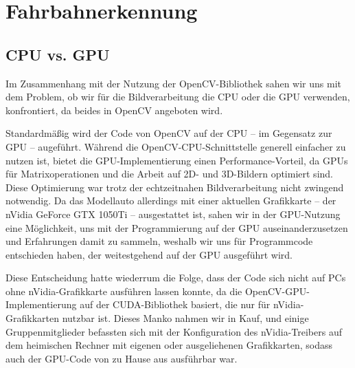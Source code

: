 \documentclass[a4paper,12pt]{report}
\begin{document}
\chapter{Fahrbahnerkennung}

\section{CPU vs. GPU}
	Im Zusammenhang mit der Nutzung der OpenCV-Bibliothek sahen wir uns mit dem Problem, ob wir für die Bildverarbeitung die CPU oder die GPU verwenden, konfrontiert, da beides in OpenCV angeboten wird.

	Standardmäßig wird der Code von OpenCV auf der CPU -- im Gegensatz zur GPU -- augeführt.
	Während die OpenCV-CPU-Schnittstelle generell einfacher zu nutzen ist, bietet die GPU-Implementierung einen Performance-Vorteil, da GPUs für Matrixoperationen und die Arbeit auf 2D- und 3D-Bildern optimiert sind.
	Diese Optimierung war trotz der echtzeitnahen Bildverarbeitung nicht zwingend notwendig.
	Da das Modellauto allerdings mit einer aktuellen Grafikkarte -- der nVidia GeForce GTX 1050Ti -- ausgestattet ist, sahen wir in der GPU-Nutzung eine Möglichkeit, uns mit der Programmierung auf der GPU auseinanderzusetzen und Erfahrungen damit zu sammeln, weshalb wir uns für Programmcode entschieden haben, der weitestgehend auf der GPU ausgeführt wird.

	Diese Entscheidung hatte wiederrum die Folge, dass der Code sich nicht auf PCs ohne nVidia-Grafikkarte ausführen lassen konnte, da die OpenCV-GPU-Implementierung auf der CUDA-Bibliothek basiert, die nur für nVidia-Grafikkarten nutzbar ist.
	Dieses Manko nahmen wir in Kauf, und einige Gruppenmitglieder befassten sich mit der Konfiguration des nVidia-Treibers auf dem heimischen Rechner mit eigenen oder ausgeliehenen Grafikkarten, sodass auch der GPU-Code von zu Hause aus ausführbar war.
\end{document}
